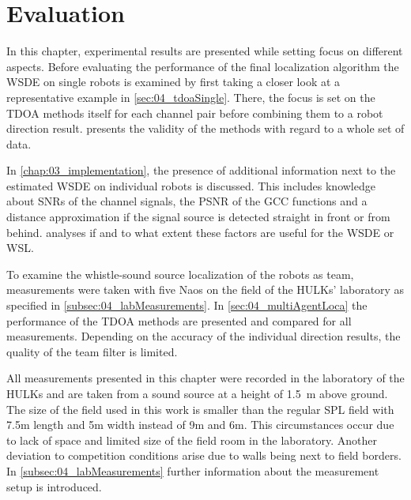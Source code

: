 \chapter{Evaluation}


In this chapter, experimental results are presented while setting
focus on different aspects.
Before evaluating the performance of the final localization algorithm the
\ac{WSDE} on single robots is examined by first taking a closer look
at a representative example in \cref{sec:04_tdoaSingle}.
There, the focus is set on the \ac{TDOA} methods itself for each channel pair
before combining them to a robot direction result.
 presents the validity of the methods with
regard to a whole set of data.

In \cref{chap:03_implementation}, the presence of additional
information next to the estimated \ac{WSDE} on individual robots
is discussed.
This includes knowledge about \acp{SNR} of the channel signals, the \ac{PSNR}
of the \ac{GCC} functions and a distance approximation if the signal source
is detected straight in front or from behind.
 analyses if and to
what extent these factors are useful for the \ac{WSDE} or \ac{WSL}.

To examine the whistle-sound source localization of the robots as team,
measurements were taken with five Naos on the field of the HULKs' laboratory
as specified in \cref{subsec:04_labMeasurements}.
In \cref{sec:04_multiAgentLoca} the performance of the \ac{TDOA} methods are presented
and compared for all measurements.
Depending on the accuracy of the individual direction results, the quality
of the team filter is limited.

All measurements presented in this chapter were recorded in the
laboratory of the HULKs and are taken from a sound source at a height of
\SI{1.5}{\meter} above ground.
The size of the field used in this work is smaller than the regular \ac{SPL}
field with 7.5\si{m} length and 5\si{m} width instead of 9\si{\meter} and 6\si{\meter}.
This circumstances occur due to lack of space and limited size of the
field room in the laboratory.
Another deviation to competition conditions arise due to walls being next to field borders.
In \cref{subsec:04_labMeasurements} further information about the measurement setup
is introduced.







